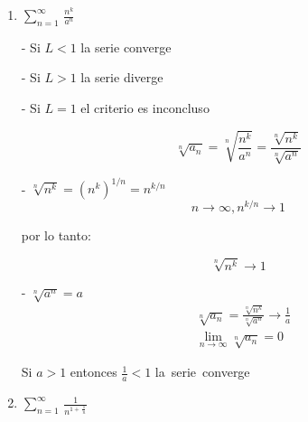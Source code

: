 \documentclass{article}
\begin{document}
\begin{enumerate}
\begin{enumerate}
- $\sqrt[n]{(3 n)!} \approx\left(\frac{3 n}{e}\right)^3=\frac{(3 n)^3}{e^3}$

- $\sqrt[n]{3^n} \approx 3$

Sustituyendo:
$$
\begin{array}{r}
\sqrt[n]{a_n}=\frac{\sqrt[n]{(n+3)!}}{\sqrt[n]{n!} \sqrt[n]{(3 n)!} \cdot \sqrt[n]{3^n}} \\
\sqrt[n]{a_n} \approx \frac{n}{\frac{n}{e} \cdot \frac{(3 n)^3}{e^3} \cdot 3} \\
\sqrt[n]{a_n} \approx \frac{n}{\frac{n}{e} \cdot \frac{(3 n)^3}{e^3} \cdot 3}
\end{array}
$$

$$
\begin{gathered}
\sqrt[n]{a_n} \approx \frac{n e^4}{n \cdot(3 n)^3 \cdot 3} \\
\sqrt[n]{a_n} \approx \frac{e^4}{(3 n)^3 \cdot 3}
\end{gathered}
$$
$$
\begin{array}{r}
n \rightarrow \infty \text { para el termino }(3 n)^3 \text { implica } \sqrt[n]{a_n} \rightarrow 0 \\
\lim _{n \rightarrow \infty} \sqrt[n]{a_n}=0
\end{array}
$$
$L=0$ por lo que la serie $0<1$ converge

\newpage
\item $\displaystyle\sum_{n=1}^{\infty}\,\frac{n^k}{a^n}$

- Si $L<1$ la serie converge

- Si $L>1$ la serie diverge

- Si $L=1$ el criterio es inconcluso

$$
\sqrt[n]{a_n}=\sqrt[n]{\frac{n^k}{a^n}}=\frac{\sqrt[n]{n^k}}{\sqrt[n]{a^n}}
$$

- $\sqrt[n]{n^k}=\left(n^k\right)^{1 / n}=n^{k / n}$
$$
n \rightarrow \infty, n^{k / n} \rightarrow 1
$$

por lo tanto:

$$
\sqrt[n]{n^k} \rightarrow 1
$$

- $\sqrt[n]{a^n}=a$
$$
\begin{aligned}
& \sqrt[n]{a_n}=\frac{\sqrt[n]{n^k}}{\sqrt[n]{a^n}} \rightarrow \frac{1}{a} \\
& \lim _{n \rightarrow \infty} \sqrt[n]{a_n}=0
\end{aligned}
$$

Si $a>1$ entonces $\frac{1}{a}<1$ la serie converge

\item $\displaystyle\sum_{n=1}^{\infty}\,\frac{1}{n^{1+\,\frac{1}{n}}}$


\end{enumerate}
\end{enumerate}
\end{document}
